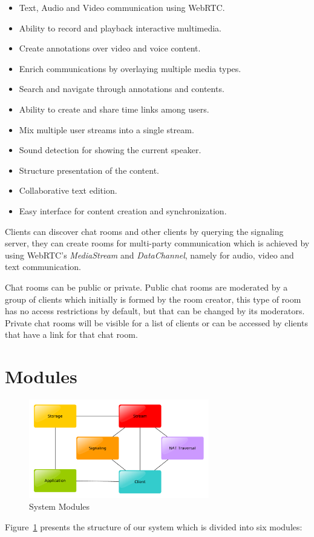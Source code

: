 \begin{itemize}
 \item Text, Audio and Video communication using \ac{WebRTC}.
 \item Ability to record and playback interactive multimedia.
 \item Create annotations over video and voice content.
 \item Enrich communications by overlaying multiple media types.
 \item Search and navigate through annotations and contents.
 \item Ability to create and share time links among users.
 \item Mix multiple user streams into a single stream.
 \item Sound detection for showing the current speaker.
 \item Structure presentation of the content.
 \item Collaborative text edition.
 \item Easy interface for content creation and synchronization. 
\end{itemize}

	Clients can discover chat rooms and other clients by querying the signaling server, they can create rooms for multi-party communication which is achieved by using \ac{WebRTC}'s \emph{MediaStream} and \emph{DataChannel}, namely for audio, video and text communication.

	Chat rooms can be public or private. Public chat rooms are moderated by a group of clients which initially is formed by the room creator, this type of room has no access restrictions by default, but that can be changed by its moderators. Private chat rooms will be visible for a list of clients or can be accessed by clients that have a link for that chat room.

\section{Modules}

\begin{figure}[H]
	\centering
	\includegraphics[width=0.7\textwidth]{figures/modules.pdf}
	\caption{System Modules}
        \label{fig:modules}
\end{figure}
	Figure~\ref{fig:modules} presents the structure of our system which is divided into six modules:

